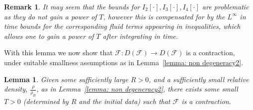 \documentclass[a4paper]{amsart}
\numberwithin{equation}{section}
\theoremstyle{plain}
\newtheorem{lemma}[theorem]{Lemma}
\newtheorem{remark}[theorem]{Remark}
\begin{document}
   \begin{remark}
       It may seem that the bounds for $I_2[\cdot], I_3[\cdot], I_4[\cdot]$ are problematic as they do not gain a power of $T$, however this is compensated for by the $L^\infty$ in time bounds for the corresponding fluid terms appearing in inequalities, which allows one to gain a power of $T$ after integrating in time.
   \end{remark}

With this lemma we now show that $\mathscr{F}: D(\mathscr{F}) \rightarrow D(\mathscr{F})$ is a contraction, under suitable smallness assumptions as in Lemma~\ref{lemma: non degeneracy2}.

\begin{lemma}
\label{lemma: fsi contraction}
    Given some sufficiently large $R > 0$, and a sufficiently small relative density, $\frac{\rho}{\rho_B}$, as in Lemma~\ref{lemma: non degeneracy2}, there exists some small $T > 0$ (determined by $R$ and the initial data) such that $\mathscr{F}$ is a contraction.
\end{lemma}
\end{document}
